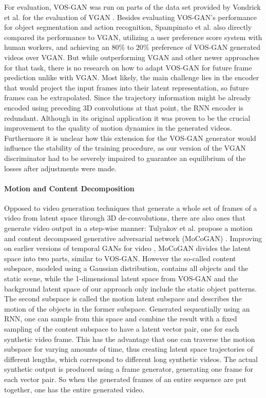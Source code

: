 For evaluation, VOS-GAN was run on parts of the data set provided by Vondrick et al. for the evaluation of VGAN \cite{vondrick2016generating}. Besides evaluating VOS-GAN's performance for object segmentation and action recognition, Spampinato et al. also directly compared its performance to VGAN, utilizing a user preference score system with human workers, and achieving an $80\%$ to $20\%$ preference of VOS-GAN generated videos over VGAN. But while outperforming VGAN and other newer approaches for that task, there is no research on how to adapt VOS-GAN for future frame prediction unlike with VGAN. Most likely, the main challenge lies in the encoder that would project the input frames into their latent representation, so future frames can be extrapolated. Since the trajectory information might be already encoded using preceding 3D convolutions at that point, the RNN encoder is redundant. Although in its original application it was proven to be the crucial improvement to the quality of motion dynamics in the generated videos. Furthermore it is unclear how this extension for the VOS-GAN generator would influence the stability of the training procedure, as our version of the VGAN discriminator had to be severely impaired to guarantee an equilibrium of the losses after adjustments were made.

\paragraph{Motion and Content Decomposition}
Opposed to video generation techniques that generate a whole set of frames of a video from latent space through 3D de-convolutions, there are also ones that generate video output in a step-wise manner: Tulyakov et al. propose a motion and content decomposed generative adversarial network (MoCoGAN) \cite{tulyakov2018mocogan}. Improving on earlier versions of temporal GANs for video \cite{saito2017temporal}, MoCoGAN divides the latent space into two parts, similar to VOS-GAN. However the so-called content subspace, modeled using a Gaussian distribution, contains all objects and the static scene, while the 1-dimensional latent space from VOS-GAN and the background latent space of our approach only include the static object patterns. The second subspace is called the motion latent subspace and describes the motion of the objects in the former subspace. Generated sequentially using an RNN, one can sample from this space and combine the result with a fixed sampling of the content subspace to have a latent vector pair, one for each synthetic video frame. This has the advantage that one can traverse the motion subspace for varying amounts of time, thus creating latent space trajectories of different lengths, which correspond to different long synthetic videos. The actual synthetic output is produced using a frame generator, generating one frame for each vector pair. So when the generated frames of an entire sequence are put together, one has the entire generated video. 

